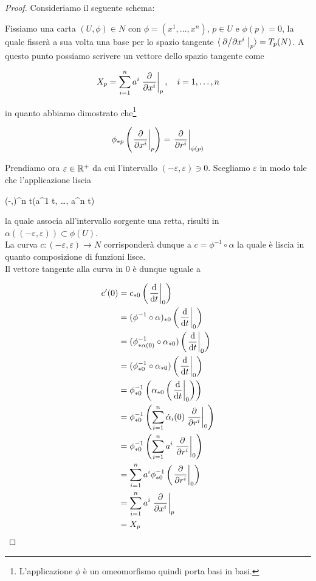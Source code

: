 \begin{proof}
	Consideriamo il seguente schema:
	

	Fissiamo una carta $ (U,\phi) \in N $ con $ \phi = (x^{1},\dots,x^{n}) $, $ p \in U $ e $ \phi(p) = 0 $, la quale fisserà a sua volta una base per lo spazio tangente $ \langle \eval{ \pdv*{x^{i}} }_{p} \rangle = T_{p}(N) $. A questo punto possiamo scrivere un vettore dello spazio tangente come
	
	\begin{equation}
		X_{p} = \sum_{i=1}^{n} a^{i} \eval{ \pdv{x^{i}} }_{p} \qcomma i=1,\dots,n
	\end{equation}

	in quanto abbiamo dimostrato che\footnote{%
		L'applicazione $ \phi $ è un omeomorfismo quindi porta basi in basi.%
	}
	
	\begin{equation}
		\phi_{*p} \left( \eval{ \pdv{x^{i}} }_{p} \right) = \eval{ \pdv{r^{i}} }_{\phi(p)}
	\end{equation}
	
	Prendiamo ora $ \varepsilon \in \mathbb{R}^{+} $ da cui l'intervallo $ (-\varepsilon,\varepsilon) \ni 0 $. Scegliamo $ \varepsilon $ in modo tale che l'applicazione liscia
	
	\map{\alpha}
		{(-\varepsilon,\varepsilon)}{\R^{n}}
		{t}{(a^{1} t, \dots, a^{n} t)}

	la quale associa all'intervallo sorgente una retta, risulti in $ \alpha((-\varepsilon,\varepsilon)) \subset \phi(U) $.\\
	La curva $ c : (-\varepsilon,\varepsilon) \to N $ corrisponderà dunque a $ c = \phi^{-1} \circ \alpha $ la quale è liscia in quanto composizione di funzioni lisce.\\
	Il vettore tangente alla curva in 0 è dunque uguale a
	
	\begin{align}
		\begin{split}
			c'(0) &= c_{*0} \left( \eval{ \dv{t} }_{0} \right)\\
			&= (\phi^{-1} \circ \alpha)_{*0} \left( \eval{ \dv{t} }_{0} \right)\\
			&= (\phi^{-1}_{*\alpha(0)} \circ \alpha_{*0}) \left( \eval{ \dv{t} }_{0} \right)\\
			&= (\phi^{-1}_{*0} \circ \alpha_{*0}) \left( \eval{ \dv{t} }_{0} \right)\\
			&= \phi^{-1}_{*0} \left( \alpha_{*0} \left( \eval{ \dv{t} }_{0} \right) \right)\\
			&= \phi^{-1}_{*0} \left( \sum_{i=1}^{n} \dot{\alpha}_{i}(0) \eval{ \pdv{r^{i}} }_{0} \right)\\
			&= \phi^{-1}_{*0} \left( \sum_{i=1}^{n} a^{i} \eval{ \pdv{r^{i}} }_{0} \right)\\
			&= \sum_{i=1}^{n} a^{i} \phi^{-1}_{*0} \left( \eval{ \pdv{r^{i}} }_{0} \right)\\
			&= \sum_{i=1}^{n} a^{i} \eval{ \pdv{x^{i}} }_{p}\\
			&= X_{p}
		\end{split}
	\end{align}


\end{proof}
